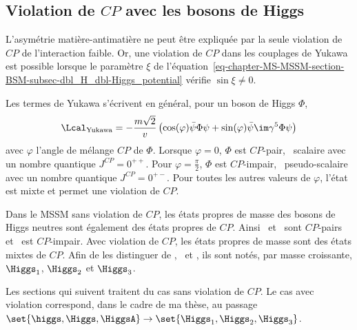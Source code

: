 \subsection{Violation de $CP$ avec les bosons de Higgs}\label{chapter-MS-MSSM-section-BSM-subsec-CPV}
L'asymétrie matière-antimatière ne peut être expliquée par la seule violation de $CP$ de l'interaction faible.
Or, une violation de $CP$ dans les couplages de Yukawa est possible lorsque le paramètre $\xi$ de l'équation~\eqref{eq-chapter-MS-MSSM-section-BSM-subsec-dbl_H_dbl-Higgs_potential} vérifie $\sin\xi\neq0$.
\par
Les termes de Yukawa s'écrivent en général, pour un boson de Higgs $\Phi$,
\begin{equation}
\Lcal_\text{Yukawa}
= - \frac{m\sqrt{2}}{v} \left( \cos(\varphi) \bar{\psi} \Phi \psi + \sin(\varphi) \bar{\psi} \im\gamma^5 \Phi \psi \right)
\end{equation}
avec $\varphi$ l'angle de mélange $CP$ de $\Phi$.
Lorsque $\varphi=0$, $\Phi$ est $CP$-pair, \ie\ scalaire avec un nombre quantique $J^{CP}=0^{++}$.
Pour $\varphi=\frac{\pi}{2}$, $\Phi$ est $CP$-impair, \ie\ pseudo-scalaire avec un nombre quantique $J^{CP}=0^{+-}$.
Pour toutes les autres valeurs de $\varphi$, l'état est mixte et permet une violation de $CP$.
\par
Dans le MSSM sans violation de $CP$, les états propres de masse des bosons de Higgs neutres sont également des états propres de $CP$.
Ainsi
\higgs\ et \Higgs\ sont $CP$-pairs
et
\HiggsA\ est $CP$-impair.
Avec violation de $CP$,
les états propres de masse sont des états mixtes de $CP$.
Afin de les distinguer de \higgs, \Higgs\ et \HiggsA,
ils sont notés, par masse croissante,
$\Higgs_1$, $\Higgs_2$ et $\Higgs_3$.
\par
Les sections qui suivent traitent du cas sans violation de $CP$.
Le cas avec violation correspond, dans le cadre de ma thèse, au passage
$\set{\higgs,\Higgs,\HiggsA} \to \set{\Higgs_1,\Higgs_2,\Higgs_3}$.